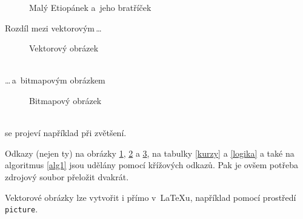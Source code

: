\documentclass[a4paper, 11pt]{article}
\begin{document}
\begin{figure}[h]
\begin{center}
\label{eti}
\caption{Malý Etiopánek a~jeho bratříček}
\end{center}
\end{figure}
\newpage
Rozdíl mezi vektorovým\,\dots
\begin{figure}[ht]
\label{oni1}
\begin{center}
\caption{Vektorový obrázek}
\end{center}
\end{figure}\\
\dots\,a~bitmapovým obrázkem
\begin{figure}[ht]
\label{oni2}
\begin{center}
\caption{Bitmapový obrázek}
\end{center}
\end{figure}\\
se projeví například při zvětšení.

Odkazy (nejen ty) na obrázky \ref{eti}, \ref{oni1} a \ref{oni2}, 
na tabulky \ref{kurzy} a \ref{logika} a také na algoritmus \ref{alg1} jsou udělány pomocí křížových odkazů. Pak je ovšem potřeba zdrojový soubor přeložit dvakrát.

Vektorové obrázky lze vytvořit i přímo v~\LaTeX u, například pomocí prostředí \texttt{picture}.
\end{document}
